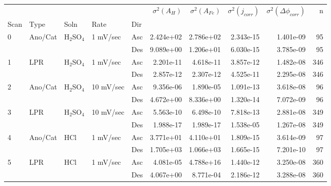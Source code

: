 \begin{tabular}{lllllrrrrr}
\toprule
  &     &     &           &     &  $\sigma^2(A_H)$ &  $\sigma^2(A_{Fe})$ &  $\sigma^2(j_{corr})$ &  $\sigma^2(\Delta \phi_{corr})$ &    n \\
Scan & Type & Soln & Rate & Dir &                  &                     &                       &                                 &      \\
\midrule
0 & Ano/Cat & H$_2$SO$_4$ & 1 mV/sec & Asc &        2.424e+02 &           2.786e+02 &             2.343e-15 &                       1.401e-09 &   95 \\
  &     &     &           & Des &        9.089e+00 &           1.206e+01 &             6.030e-15 &                       3.785e-09 &   95 \\
1 & LPR & H$_2$SO$_4$ & 1 mV/sec & Asc &        2.201e-11 &           4.618e-11 &             3.857e-12 &                       1.482e-08 &  346 \\
  &     &     &           & Des &        2.857e-12 &           2.307e-12 &             4.525e-11 &                       2.295e-08 &  346 \\
2 & Ano/Cat & H$_2$SO$_4$ & 10 mV/sec & Asc &        9.356e-06 &           1.890e-05 &             1.091e-13 &                       3.618e-08 &   96 \\
  &     &     &           & Des &        4.672e+00 &           8.336e+00 &             1.320e-14 &                       7.072e-09 &   96 \\
3 & LPR & H$_2$SO$_4$ & 10 mV/sec & Asc &        5.563e-10 &           6.498e-10 &             7.818e-13 &                       2.881e-08 &  349 \\
  &     &     &           & Des &        1.988e-17 &           1.989e-17 &             1.538e-05 &                       1.267e-08 &  349 \\
4 & Ano/Cat & HCl & 1 mV/sec & Asc &        3.771e+01 &           4.110e+01 &             1.809e-15 &                       3.614e-09 &   97 \\
  &     &     &           & Des &        1.705e+03 &           1.066e+03 &             1.665e-15 &                       7.201e-10 &   97 \\
5 & LPR & HCl & 1 mV/sec & Asc &        4.081e-05 &           4.788e+16 &             1.440e-12 &                       3.250e-08 &  360 \\
  &     &     &           & Des &        4.067e+00 &           8.771e-04 &             2.186e-12 &                       3.288e-08 &  360 \\

\end{tabular}
